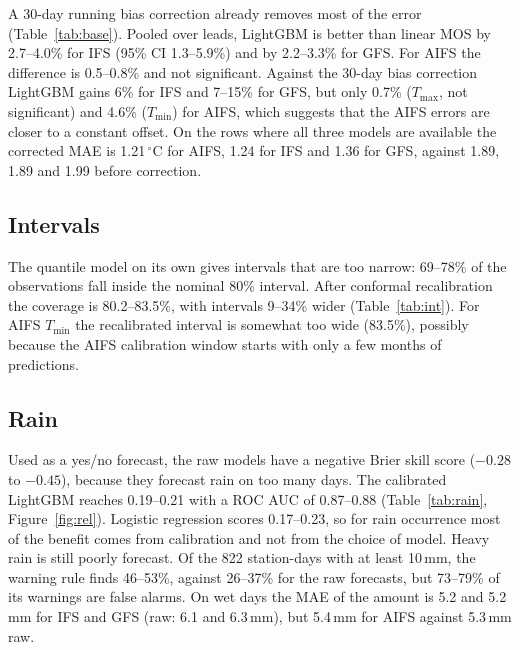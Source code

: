 \documentclass{article}
\begin{document}
A 30-day running bias correction already removes most of the error (Table~\ref{tab:base}). Pooled over leads, LightGBM is better than linear MOS by 2.7--4.0\% for IFS (95\% CI 1.3--5.9\%) and by 2.2--3.3\% for GFS. For AIFS the difference is 0.5--0.8\% and not significant. Against the 30-day bias correction LightGBM gains 6\% for IFS and 7--15\% for GFS, but only 0.7\% ($T_{\max}$, not significant) and 4.6\% ($T_{\min}$) for AIFS, which suggests that the AIFS errors are closer to a constant offset. On the rows where all three models are available the corrected MAE is 1.21\,$^\circ$C for AIFS, 1.24 for IFS and 1.36 for GFS, against 1.89, 1.89 and 1.99 before correction.

\begin{table}[t]
\caption{MAE ($^\circ$C) of all temperature methods at leads 1, 4 and 7. The lowest value in each row is in bold.}
\label{tab:base}
\centering\small

\end{table}

\subsection{Intervals}
The quantile model on its own gives intervals that are too narrow: 69--78\% of the observations fall inside the nominal 80\% interval. After conformal recalibration the coverage is 80.2--83.5\%, with intervals 9--34\% wider (Table~\ref{tab:int}). For AIFS $T_{\min}$ the recalibrated interval is somewhat too wide (83.5\%), possibly because the AIFS calibration window starts with only a few months of predictions.

\begin{table}[t]
\caption{Coverage and mean width ($^\circ$C) of the 80\% intervals.}
\label{tab:int}
\centering\small

\end{table}

\subsection{Rain}
Used as a yes/no forecast, the raw models have a negative Brier skill score ($-0.28$ to $-0.45$), because they forecast rain on too many days. The calibrated LightGBM reaches 0.19--0.21 with a ROC AUC of 0.87--0.88 (Table~\ref{tab:rain}, Figure~\ref{fig:rel}). Logistic regression scores 0.17--0.23, so for rain occurrence most of the benefit comes from calibration and not from the choice of model. Heavy rain is still poorly forecast. Of the 822 station-days with at least 10\,mm, the warning rule finds 46--53\%, against 26--37\% for the raw forecasts, but 73--79\% of its warnings are false alarms. On wet days the MAE of the amount is 5.2 and 5.2\,mm for IFS and GFS (raw: 6.1 and 6.3\,mm), but 5.4\,mm for AIFS against 5.3\,mm raw.
\end{document}
